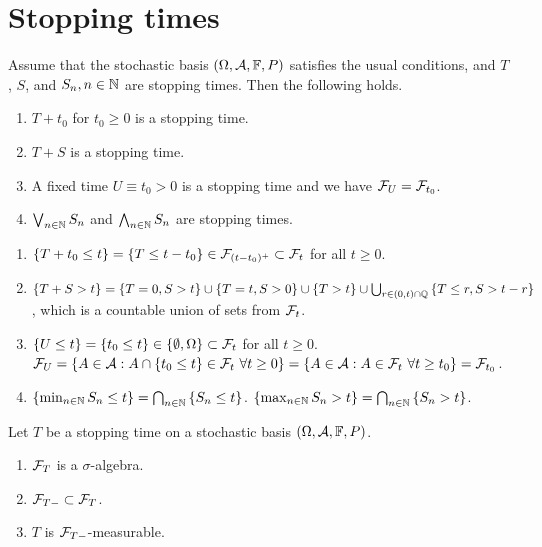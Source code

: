 \section{Stopping times}

 Assume that the stochastic basis
$(\Omega, \mathcal A, \mathbb F, P)$ satisfies the usual conditions, and $T$, $S$, and $S_n,
n\in\mathbb N$ are stopping times. Then the following holds.
\begin{enumerate}
    \item $T + t_0$ for $t_0\geq 0$ is a stopping time.
    \item $T+S$ is a stopping time.
    \item A fixed time $U \equiv t_0>0$ is a stopping time and we have $\mathcal F_U = \mathcal F_{t_0}$.
    \item $\bigvee_{n\in\mathbb N} S_n$ and $\bigwedge_{n\in\mathbb N} S_n$ are stopping times. 
\end{enumerate}

\solution
\begin{enumerate}
\item $\left\{ T+t_{0}\leq t \right\} = \left\{ T\leq t-t_{0} \right\} \in
    \mathcal F_{(t-t_0)^{+}} \subset \mathcal F_{t}$ for all $t\geq 0$.
\item $\left\{ T+S > t \right\} = \left\{ T=0, S>t \right\} \cup \left\{ T=t,
    S>0 \right\} \cup \left\{ T>t \right\} \cup \bigcup_{r\in(0,t)\cap \mathbb Q}
    \left\{ T\leq r , S> t-r \right\}$, which is a countable union of sets from
    $\mathcal F_{t}$. 
\item $\left\{ U \leq t \right\} = \left\{ t_{0} \leq t \right\} \in \left\{
    \emptyset, \Omega \right\} \subset \mathcal F_{t}$ for all $t\geq 0$. 
    $\mathcal F_U = \left\{ A\in\mathcal A : A \cap \left\{ t_0 \leq t \right\}\in\mathcal F_t \
    \forall t\geq 0 \right\} = \left\{ A\in\mathcal A : A\in\mathcal F_t \ \forall t\geq t_0
    \right\} = \mathcal F_{t_0}$.
\item $\left\{ \min_{n\in\mathbb N} S_{n} \leq t \right\} = \bigcap_{n\in\mathbb N} \left\{
        S_{n}\leq t \right\}$. $\left\{ \max_{n\in\mathbb N} S_n > t \right\} =
        \bigcap_{n\in\mathbb N} \left\{ S_{n} > t \right\}$.
\end{enumerate}

 Let $T$ be a stopping time on a
stochastic basis $(\Omega, \mathcal A, \mathbb F, P)$.
\begin{enumerate}
    \item $\mathcal F_T$ is a $\sigma$-algebra.
    \item $\mathcal F_{T-} \subset \mathcal F_{T}$.
    \item $T$ is $\mathcal F_{T-}$-measurable.
\end{enumerate}

